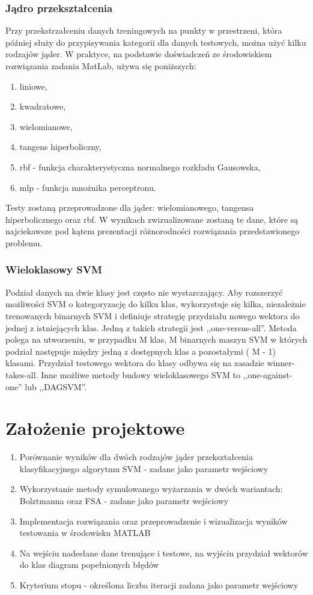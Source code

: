 \documentclass{article}
\begin{document}
\subsubsection{Jądro przekształcenia}
Przy przekstrzałceniu danych treningowych na punkty w przestrzeni, która później służy do przypisywania kategorii dla danych testowych, można użyć kilku rodzajów jąder. W praktyce, na podstawie doświadczeń ze środowiskiem rozwiązania zadania MatLab, używa się poniższych:
\begin{enumerate}
\item liniowe,
\item kwadratowe,
\item wielomianowe,
\item tangens hiperboliczny,
\item rbf - funkcja charakterystyczna normalnego rozkładu Gausowska,
\item mlp - funkcja mnożnika perceptronu.
\end{enumerate}
Testy zostaną przeprowadzone dla jąder: wielomianowego, tangensa hiperbolicznego oraz rbf. W wynikach zwizualizowane zostaną te dane, które są najciekawsze pod kątem prezentacji różnorodności rozwiązania przedstawionego problemu.
\subsubsection{Wieloklasowy SVM}
Podział danych na dwie klasy jest często nie wystarczający. Aby rozszerzyć możliwości SVM o kategoryzację do kilku klas, wykorzystuje się kilka, niezależnie trenowanych binarnych SVM i definiuje strategię przydziału nowego wektora do jednej z istniejących klas. Jedną z takich strategii jest ,,one-versus-all''. Metoda polega na utworzeniu, w przypadku M klas, M binarnych maszyn SVM w których podział następuje między jedną z dostępnych klas a pozostałymi ( M - 1) klasami. Przydział testowego wektora do klasy odbywa się na zasadzie winner-takes-all.
Inne możliwe metody budowy wieloklasowego SVM to ,,one-against-one'' lub ,,DAGSVM''.
 

\section{Założenie projektowe}
\begin{enumerate}
\item Porównanie wyników dla dwóch rodzajów jąder przekształcenia klasyfikacyjnego algorytmu SVM - zadane jako parametr wejściowy
\item Wykorzystanie metody symulowanego wyżarzania w dwóch wariantach: Bolztmanna oraz FSA - zadane jako parametr wejściowy
\item Implementacja rozwiązania oraz przeprowadzenie i wizualizacja wyników testowania w środowisku MATLAB
\item Na wejściu nadesłane dane trenujące i testowe, na wyjściu przydział wektorów do klas diagram popełnionych błędów
\item Kryterium stopu - określona liczba iteracji zadana jako parametr wejściowy
\end{enumerate}
\end{document}
